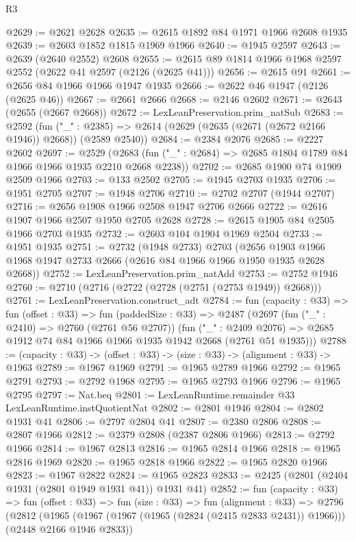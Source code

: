 \begin{lexlean}{R3}
\begin{coremodule}
@2629 := @2621 @2628
@2635 := @2615 @1892 @84 @1971 @1966 @2608 @1935
@2639 := @2603 @1852 @1815 @1969 @1966
@2640 := @1945 @2597
@2643 := @2639 (@2640 @2552) @2608
@2655 := @2615 @89 @1814 @1966 @1968 @2597 @2552 (@2622 @41 @2597 (@2126 (@2625 @41)))
@2656 := @2615 @91
@2661 := @2656 @84 @1966 @1966 @1947 @1935
@2666 := @2622 @46 @1947 (@2126 (@2625 @46))
@2667 := @2661 @2666
@2668 := @2146 @2602
@2671 := @2643 (@2655 (@2667 @2668))
@2672 := LexLeanPreservation.prim_natSub
@2683 := @2592
    (fun ("_" : @2385) => @2614 (@2629 (@2635 (@2671 (@2672 @2166 @1946)) @2668)) (@2589 @2540))
@2684 := @2384 @2076
@2685 := @2227 @2602
@2697 := @2529
    (@2683 (fun ("_" : @2684) => @2685 @1804 @1789 @84 @1966 @1966 @1935 @2210 @2668 @2238))
@2702 := @2685 @1900 @74 @1909 @2509 @1966
@2703 := @133 @2502
@2705 := @1945 @2703 @1935
@2706 := @1951 @2705
@2707 := @1948 @2706
@2710 := @2702 @2707 (@1944 @2707)
@2716 := @2656 @1908 @1966 @2508 @1947 @2706 @2666
@2722 := @2616 @1907 @1966 @2507 @1950 @2705 @2628
@2728 := @2615 @1905 @84 @2505 @1966 @2703 @1935
@2732 := @2603 @104 @1904 @1969 @2504
@2733 := @1951 @1935
@2751 := @2732
    (@1948 @2733)
    @2703
    (@2656 @1903 @1966 @1968 @1947 @2733 @2666 (@2616 @84 @1966 @1966 @1950 @1935 @2628 @2668))
@2752 := LexLeanPreservation.prim_natAdd
@2753 := @2752 @1946
@2760 := @2710 (@2716 (@2722 (@2728 (@2751 (@2753 @1949)) @2668)))
@2761 := LexLeanPreservation.construct_adt
@2784 := fun (capacity : @33) =>
  fun (offset : @33) =>
  fun (paddedSize : @33) =>
  @2487
    (@2697
      (fun ("_" : @2410) => @2760 (@2761 @56 @2707))
      (fun ("_" : @2409 @2076) =>
      @2685 @1912 @74 @84 @1966 @1966 @1935 @1942 @2668 (@2761 @51 @1935)))
@2788 := (capacity : @33) -> (offset : @33) -> (size : @33) -> (alignment : @33) -> @1963
@2789 := @1967 @1969
@2791 := @1965 @2789 @1966
@2792 := @1965 @2791
@2793 := @2792 @1968
@2795 := @1965 @2793 @1966
@2796 := @1965 @2795
@2797 := Nat.beq
@2801 := LexLeanRuntime.remainder @33 LexLeanRuntime.instQuotientNat
@2802 := @2801 @1946
@2804 := @2802 @1931 @41
@2806 := @2797 @2804 @41
@2807 := @2380 @2806
@2808 := @2807 @1966
@2812 := @2379 @2808 (@2387 @2806 @1966)
@2813 := @2792 @1966
@2814 := @1967 @2813
@2816 := @1965 @2814 @1966
@2818 := @1965 @2816 @1969
@2820 := @1965 @2818 @1966
@2822 := @1965 @2820 @1966
@2823 := @1967 @2822
@2824 := @1965 @2823
@2833 := @2425 (@2801 (@2404 @1931 (@2801 @1949 @1931 @41)) @1931 @41)
@2852 := fun (capacity : @33) =>
  fun (offset : @33) =>
  fun (size : @33) =>
  fun (alignment : @33) =>
  @2796
    (@2812
      (@1965 (@1967 (@1967 (@1965 (@2824 (@2415 @2833 @2431)) @1966))) (@2448 @2166 @1946 @2833))

\end{coremodule}
\end{lexlean}
